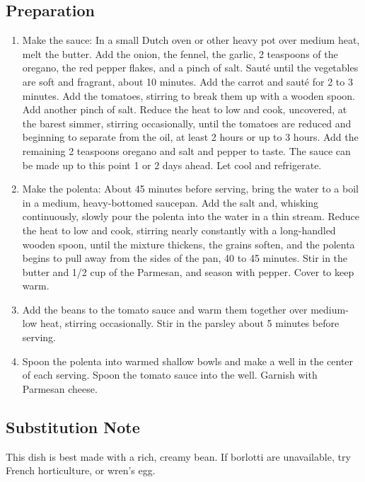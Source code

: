 \subsection{Preparation}
\begin{enumerate}
    \item Make the sauce: In a small Dutch oven or other heavy pot over medium heat, melt the butter. Add the onion, the fennel, the garlic, 2 teaspoons of the oregano, the red pepper flakes, and a pinch of salt. Saut\'{e} until the vegetables are soft and fragrant, about 10 minutes. Add the carrot and saut\'{e} for 2 to 3 minutes. Add the tomatoes, stirring to break them up with a wooden spoon. Add another pinch of salt. Reduce the heat to low and cook, uncovered, at the barest simmer, stirring occasionally, until the tomatoes are reduced and beginning to separate from the oil, at least 2 hours or up to 3 hours. Add the remaining 2 teaspoons oregano and salt and pepper to taste. The sauce can be made up to this point 1 or 2 days ahead. Let cool and refrigerate.
    \item Make the polenta: About 45 minutes before serving, bring the water to a boil in a medium, heavy-bottomed saucepan. Add the salt and, whisking continuously, slowly pour the polenta into the water in a thin stream. Reduce the heat to low and cook, stirring nearly constantly with a long-handled wooden spoon, until the mixture thickens, the grains soften, and the polenta begins to pull away from the sides of the pan, 40 to 45 minutes. Stir in the butter and 1/2 cup of the Parmesan, and season with pepper. Cover to keep warm.
    \item Add the beans to the tomato sauce and warm them together over medium-low heat, stirring occasionally. Stir in the parsley about 5 minutes before serving.
    \item Spoon the polenta into warmed shallow bowls and make a well in the center of each serving. Spoon the tomato sauce into the well. Garnish with Parmesan cheese.
\end{enumerate}

\subsection{Substitution Note}
This dish is best made with a rich, creamy bean. If borlotti are unavailable, try French horticulture, or wren's egg.
